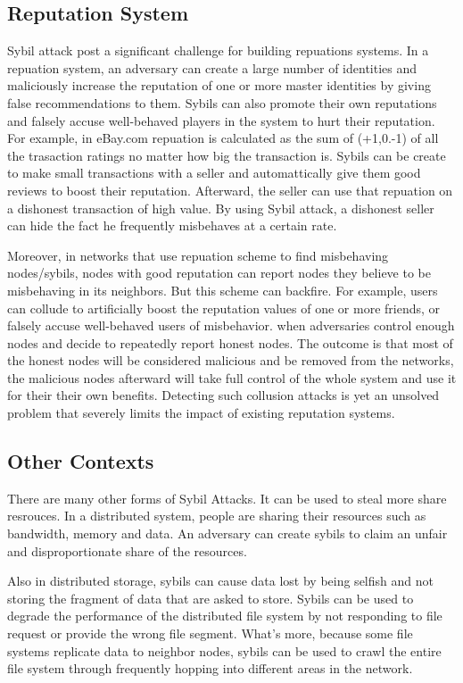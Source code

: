 \documentclass[conference]{IEEEtran}
\begin{document}
\subsection{Reputation System}
Sybil attack post a significant challenge for building repuations systems. In a repuation system, an adversary can create a large number of identities and maliciously increase the reputation of one or more master identities by giving false recommendations to them. Sybils can also promote their own reputations and falsely accuse well-behaved players in the system to hurt their reputation. For example, in eBay.com repuation is calculated as the sum of (+1,0.-1) of all the trasaction ratings no matter how big the transaction is. Sybils can be create to make small transactions with a seller and automattically give them good reviews to boost their reputation. Afterward, the seller can use that repuation on a dishonest transaction of high value. By using Sybil attack, a dishonest seller can hide the fact he frequently misbehaves at a certain rate.

Moreover, in networks that use repuation scheme to find misbehaving nodes/sybils, nodes with good reputation can report nodes they believe to be misbehaving in its neighbors. But this scheme can backfire.  For example, users can collude to artificially boost the reputation values of one or more friends, or falsely accuse well-behaved users of misbehavior. when adversaries control enough nodes and decide to repeatedly report honest nodes. The outcome is that most of the honest nodes will be considered malicious and be removed from the networks, the malicious nodes afterward will take full control of the whole system and use it for their their own benefits. Detecting such collusion attacks is yet an unsolved problem that severely limits the impact of existing reputation systems.\cite{Swamynathan10reputation}\cite{Lian07anempirical}


\subsection{Other Contexts}
There are many other forms of Sybil Attacks. It can be used to steal more share resrouces.
In a distributed system, people are sharing their resources such as bandwidth, memory and data. An adversary can create sybils to claim an unfair and disproportionate share of the resources. 

Also in distributed storage, sybils can cause data lost by being selfish and not storing the fragment of data that are asked to store. Sybils can be used to degrade the performance of the distributed file system by not responding to file request or provide the wrong file segment. What's more, because some file systems replicate data to neighbor nodes, sybils can be used to crawl the entire file system through frequently hopping into different areas in the network.\cite{Lian07anempirical}\cite{wolchok09defeatingvanish}
\end{document}
